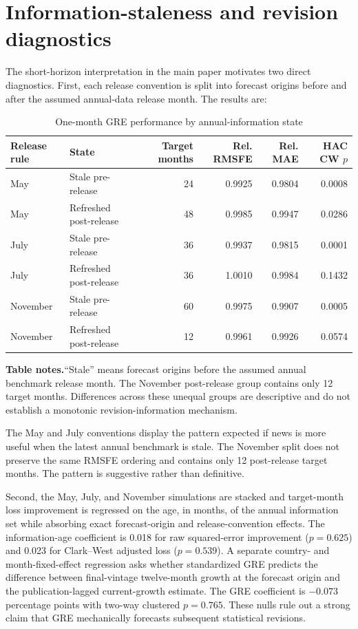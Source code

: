 \documentclass[12pt]{article}
\newcommand{\TableNote}[1]{%
  \par\vspace{0.65ex}\noindent
  \begin{minipage}{0.97\linewidth}\footnotesize\singlespacing\raggedright
  \textbf{Table notes.}\enspace #1
  \end{minipage}}
\begin{document}
\section{Information-staleness and revision diagnostics}
The short-horizon interpretation in the main paper motivates two direct diagnostics. First, each release convention is split into forecast origins before and after the assumed annual-data release month. The results are:
\begin{table}[htbp]
\centering\scriptsize
\caption{One-month GRE performance by annual-information state}
\begin{tabular}{llrrrr}
\toprule
Release rule & State & Target months & Rel. RMSFE & Rel. MAE & HAC CW $p$\\
\midrule
May & Stale pre-release & 24 & 0.9925 & 0.9804 & 0.0008\\
May & Refreshed post-release & 48 & 0.9985 & 0.9947 & 0.0286\\
July & Stale pre-release & 36 & 0.9937 & 0.9815 & 0.0001\\
July & Refreshed post-release & 36 & 1.0010 & 0.9984 & 0.1432\\
November & Stale pre-release & 60 & 0.9975 & 0.9907 & 0.0005\\
November & Refreshed post-release & 12 & 0.9961 & 0.9926 & 0.0574\\
\bottomrule
\end{tabular}
\TableNote{``Stale'' means forecast origins before the assumed annual benchmark release month. The November post-release group contains only 12 target months. Differences across these unequal groups are descriptive and do not establish a monotonic revision-information mechanism.}
\end{table}
The May and July conventions display the pattern expected if news is more useful when the latest annual benchmark is stale. The November split does not preserve the same RMSFE ordering and contains only 12 post-release target months. The pattern is suggestive rather than definitive.

Second, the May, July, and November simulations are stacked and target-month loss improvement is regressed on the age, in months, of the annual information set while absorbing exact forecast-origin and release-convention effects. The information-age coefficient is 0.018 for raw squared-error improvement ($p=0.625$) and 0.023 for Clark--West adjusted loss ($p=0.539$). A separate country- and month-fixed-effect regression asks whether standardized GRE predicts the difference between final-vintage twelve-month growth at the forecast origin and the publication-lagged current-growth estimate. The GRE coefficient is $-0.073$ percentage points with two-way clustered $p=0.765$. These nulls rule out a strong claim that GRE mechanically forecasts subsequent statistical revisions.
\end{document}
